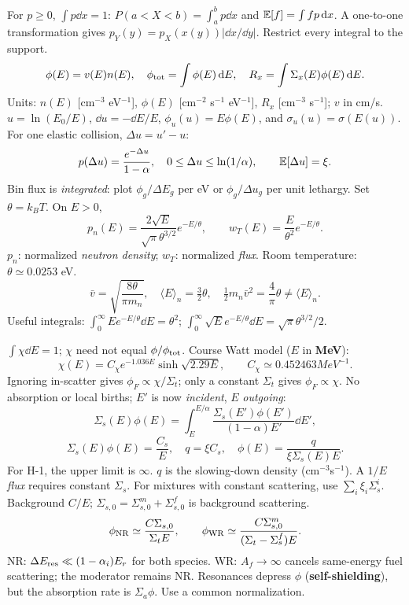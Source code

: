 \newpage
\begin{handoutcolumns}
For $p\ge0$, $\int p\dd x=1$:
$P(a<X<b)=\int_a^bp\dd x$ and $\mathbb E[f]=\int fp\,\mathrm d x$.
A one-to-one transformation gives $p_Y(y)=p_X(x(y))|\dd x/\dd y|$.
Restrict every integral to the support.
\[
 \phi(E)=v(E)n(E),\quad \phi_{\rm tot}=\int\phi(E)\,\mathrm d E,
 \quad R_x=\int\Sigma_x(E)\phi(E)\,\mathrm d E.
\]
Units: $n(E)$ [cm$^{-3}$ eV$^{-1}$], $\phi(E)$ [cm$^{-2}$ s$^{-1}$ eV$^{-1}$],
$R_x$ [cm$^{-3}$ s$^{-1}$]; $v$ in cm/s.
 $u=\ln(E_0/E)$, $\dd u=-\dd E/E$,
$\phi_u(u)=E\phi(E)$, and $\sigma_u(u)=\sigma(E(u))$.
For one elastic collision, $\Delta u=u'-u$:
\[
 p(\Delta u)=\frac{e^{-\Delta u}}{1-\alpha},
 \quad 0\le\Delta u\le\ln(1/\alpha),\qquad\mathbb E[\Delta u]=\xi.
\]
Bin flux is \emph{integrated}: plot $\phi_g/\Delta E_g$ per eV or
$\phi_g/\Delta u_g$ per unit lethargy.
 Set $\theta=k_BT$. On $E>0$,
\[
 p_n(E)=\frac{2\sqrt E}{\sqrt\pi\theta^{3/2}}e^{-E/\theta},
 \qquad w_T(E)=\frac{E}{\theta^2}e^{-E/\theta}.
\]
$p_n$: normalized \emph{neutron density}; $w_T$: normalized \emph{flux}.
Room temperature: $\theta\simeq0.0253$ eV.
\[
 \bar v=\sqrt{\frac{8\theta}{\pi m_n}},\quad
 \langle E\rangle_n=\tfrac32\theta,\quad
 \tfrac12m_n\bar v^2=\frac4\pi\theta\ne\langle E\rangle_n.
\]
Useful integrals: $\int_0^\infty Ee^{-E/\theta}\dd E=\theta^2$;
$\int_0^\infty\sqrt E e^{-E/\theta}\dd E=\sqrt\pi\theta^{3/2}/2$.

 $\int\chi\dd E=1$; $\chi$ need not equal
$\phi/\phi_{\rm tot}$. Course Watt model ($E$ in \textbf{MeV}):
\[
 \chi(E)=C_\chi e^{-1.036E}\sinh\sqrt{2.29E},\qquad
 C_\chi\simeq0.452463\unit{MeV^{-1}}.
\]
Ignoring in-scatter gives $\phi_F\propto\chi/\Sigma_t$;
only a constant $\Sigma_t$ gives $\phi_F\propto\chi$.
 No absorption or local births;
$E'$ is now \emph{incident}, $E$ \emph{outgoing}:
\[
 \Sigma_s(E)\phi(E)=\int_E^{E/\alpha}
 \frac{\Sigma_s(E')\phi(E')}{(1-\alpha)E'}\dd E',
\]
\[
 \Sigma_s(E)\phi(E)=\frac{C_s}{E},\quad q=\xi C_s,
 \quad \phi(E)=\frac{q}{\xi\Sigma_s(E)E}.
\]
For H-1, the upper limit is $\infty$. $q$ is the slowing-down density
(cm$^{-3}$s$^{-1}$). A $1/E$ \emph{flux} requires constant $\Sigma_s$.
For mixtures with constant scattering, use $\sum_i\xi_i\Sigma_s^i$.
 Background $C/E$;
$\Sigma_{s,0}=\Sigma_{s,0}^m+\Sigma_{s,0}^f$ is background scattering.
\[
 \phi_{\rm NR}\simeq\frac{C\Sigma_{s,0}}{\Sigma_t E},\qquad
 \phi_{\rm WR}\simeq\frac{C\Sigma_{s,0}^m}{(\Sigma_t-\Sigma_s^f)E}.
\]
NR: $\Delta E_{\rm res}\ll(1-\alpha_i)E_r$ for both species.
WR: $A_f\to\infty$ cancels same-energy fuel scattering; the moderator
remains NR. Resonances depress $\phi$ (\textbf{self-shielding}), but the
absorption rate is $\Sigma_a\phi$. Use a common normalization.


\end{handoutcolumns}
